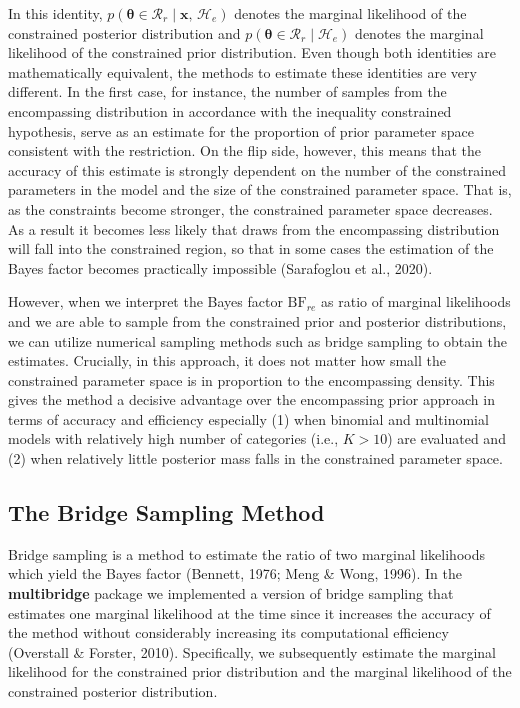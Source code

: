 \documentclass[
  english,
  man,floatsintext]{apa6}
\begin{document}
In this identity, \(p(\boldsymbol{\theta} \in \mathcal{R}_r \mid \mathbf{x}\text{, }\mathcal{H}_e)\) denotes the marginal likelihood of the constrained posterior distribution and \(p(\boldsymbol{\theta} \in \mathcal{R}_r \mid \mathcal{H}_e)\) denotes the marginal likelihood of the constrained prior distribution. Even though both identities are mathematically equivalent, the methods to estimate these identities are very different.
In the first case, for instance, the number of samples from the encompassing distribution in accordance with the inequality constrained hypothesis, serve as an estimate for the proportion of prior parameter space consistent with the restriction. On the flip side, however, this means that the accuracy of this estimate is strongly dependent on the number of the constrained parameters in the model and the size of the constrained parameter space. That is, as the constraints become stronger, the constrained parameter space decreases. As a result it becomes less likely that draws from the encompassing distribution will fall into the constrained region, so that in some cases the estimation of the Bayes factor becomes practically impossible (Sarafoglou et al., 2020).

However, when we interpret the Bayes factor \(\text{BF}_{re}\) as ratio of marginal likelihoods and we are able to sample from the constrained prior and posterior distributions, we can utilize numerical sampling methods such as bridge sampling to obtain the estimates. Crucially, in this approach, it does not matter how small the constrained parameter space is in proportion to the encompassing density. This gives the method a decisive advantage over the encompassing prior approach in terms of accuracy and efficiency especially (1) when binomial and multinomial models with relatively high number of categories (i.e., \(K > 10\)) are evaluated and (2) when relatively little posterior mass falls in the constrained parameter space.

\hypertarget{the-bridge-sampling-method}{%
\subsection{The Bridge Sampling Method}\label{the-bridge-sampling-method}}

Bridge sampling is a method to estimate the ratio of two marginal likelihoods which yield the Bayes factor (Bennett, 1976; Meng \& Wong, 1996). In the \textbf{multibridge} package we implemented a version of bridge sampling that estimates one marginal likelihood at the time since it increases the accuracy of the method without considerably increasing its computational efficiency (Overstall \& Forster, 2010). Specifically, we subsequently estimate the marginal likelihood for the constrained prior distribution and the marginal likelihood of the constrained posterior distribution.
\end{document}
